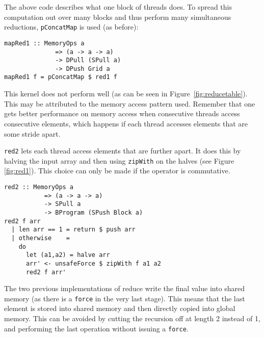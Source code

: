 The above code describes what one block of threads does. To spread 
this computation out over many blocks and thus perform many simultaneous 
reductions, {\tt pConcatMap} is used (as before): 

\begin{small} 
\begin{Verbatim}[samepage = true] 
mapRed1 :: MemoryOps a 
              => (a -> a -> a) 
              -> DPull (SPull a) 
              -> DPush Grid a
mapRed1 f = pConcatMap $ red1 f
\end{Verbatim}
\end{small} %

This kernel does not perform well (as can be seen in Figure~\ref{fig:reducetable}). 
This may be attributed to the memory access pattern used. Remember that
one gets better performance on memory access when consecutive threads
access consecutive elements, which happens if
each thread accesses elements that are some stride apart. 


{\tt red2} lets each thread access elements that are further apart. It does 
this by halving the input array and then using {\tt zipWith} on the halves (see Figure~ \ref{fig:red1}). 
This choice can only be made if the operator is commutative.  

\begin{small} 
\begin{Verbatim}[samepage = true] 
red2 :: MemoryOps a
           => (a -> a -> a)
           -> SPull a
           -> BProgram (SPush Block a)
red2 f arr
  | len arr == 1 = return $ push arr
  | otherwise    = 
    do
      let (a1,a2) = halve arr
      arr' <- unsafeForce $ zipWith f a1 a2
      red2 f arr'   
\end{Verbatim}
\end{small}



The two previous implementations of reduce write the final value into shared 
memory (as there is a {\tt force} 
in the very last stage). This means that the last element is stored into shared 
memory and then directly copied into global memory. This can be avoided by cutting 
the recursion off at length 2 instead of 1, and performing the last operation 
without issuing a {\tt force}. 

